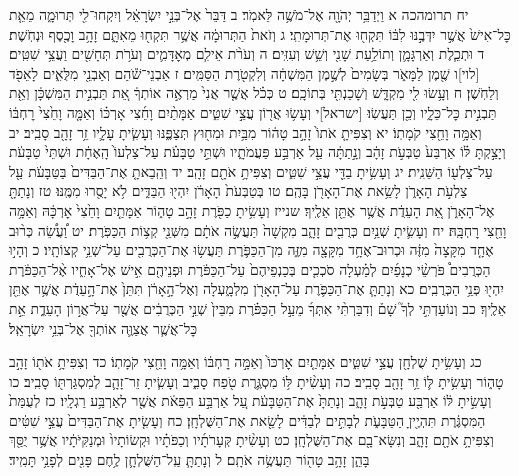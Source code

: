 \documentclass[twoside, openany, parskip=half, 11pt]{book}
\begin{document}
יח תרומהכה א וַיְדַבֵּ֥ר יְהֹוָ֖ה אֶל־מֹשֶׁ֥ה לֵּאמֹֽר׃ ב דַּבֵּר֙ אֶל־בְּנֵ֣י יִשְׂרָאֵ֔ל וְיִקְחוּ־לִ֖י תְּרוּמָ֑ה מֵאֵ֤ת כׇּל־אִישׁ֙ אֲשֶׁ֣ר יִדְּבֶ֣נּוּ לִבּ֔וֹ תִּקְח֖וּ אֶת־תְּרוּמָתִֽי׃ ג וְזֹאת֙ הַתְּרוּמָ֔ה אֲשֶׁ֥ר תִּקְח֖וּ מֵאִתָּ֑ם זָהָ֥ב וָכֶ֖סֶף וּנְחֹֽשֶׁת׃ ד וּתְכֵ֧לֶת וְאַרְגָּמָ֛ן וְתוֹלַ֥עַת שָׁנִ֖י וְשֵׁ֥שׁ וְעִזִּֽים׃ ה וְעֹרֹ֨ת אֵילִ֧ם מְאׇדָּמִ֛ים וְעֹרֹ֥ת תְּחָשִׁ֖ים וַעֲצֵ֥י שִׁטִּֽים׃ [לוי]ו שֶׁ֖מֶן לַמָּאֹ֑ר בְּשָׂמִים֙ לְשֶׁ֣מֶן הַמִּשְׁחָ֔ה וְלִקְטֹ֖רֶת הַסַּמִּֽים׃ ז אַבְנֵי־שֹׁ֕הַם וְאַבְנֵ֖י מִלֻּאִ֑ים לָאֵפֹ֖ד וְלַחֹֽשֶׁן׃ ח וְעָ֥שׂוּ לִ֖י מִקְדָּ֑שׁ וְשָׁכַנְתִּ֖י בְּתוֹכָֽם׃ ט כְּכֹ֗ל אֲשֶׁ֤ר אֲנִי֙ מַרְאֶ֣ה אוֹתְךָ֔ אֵ֚ת תַּבְנִ֣ית הַמִּשְׁכָּ֔ן וְאֵ֖ת תַּבְנִ֣ית כׇּל־כֵּלָ֑יו וְכֵ֖ן תַּעֲשֽׂוּ׃
[ישראל]י וְעָשׂ֥וּ אֲר֖וֹן עֲצֵ֣י שִׁטִּ֑ים אַמָּתַ֨יִם וָחֵ֜צִי אָרְכּ֗וֹ וְאַמָּ֤ה וָחֵ֙צִי֙ רׇחְבּ֔וֹ וְאַמָּ֥ה וָחֵ֖צִי קֹמָתֽוֹ׃ יא וְצִפִּיתָ֤ אֹתוֹ֙ זָהָ֣ב טָה֔וֹר מִבַּ֥יִת וּמִח֖וּץ תְּצַפֶּ֑נּוּ וְעָשִׂ֧יתָ עָלָ֛יו זֵ֥ר זָהָ֖ב סָבִֽיב׃ יב וְיָצַ֣קְתָּ לּ֗וֹ אַרְבַּע֙ טַבְּעֹ֣ת זָהָ֔ב וְנָ֣תַתָּ֔ה עַ֖ל אַרְבַּ֣ע פַּעֲמֹתָ֑יו וּשְׁתֵּ֣י טַבָּעֹ֗ת עַל־צַלְעוֹ֙ הָֽאֶחָ֔ת וּשְׁתֵּי֙ טַבָּעֹ֔ת עַל־צַלְע֖וֹ הַשֵּׁנִֽית׃ יג וְעָשִׂ֥יתָ בַדֵּ֖י עֲצֵ֣י שִׁטִּ֑ים וְצִפִּיתָ֥ אֹתָ֖ם זָהָֽב׃ יד וְהֵֽבֵאתָ֤ אֶת־הַבַּדִּים֙ בַּטַּבָּעֹ֔ת עַ֖ל צַלְעֹ֣ת הָאָרֹ֑ן לָשֵׂ֥את אֶת־הָאָרֹ֖ן בָּהֶֽם׃ טו בְּטַבְּעֹת֙ הָאָרֹ֔ן יִהְי֖וּ הַבַּדִּ֑ים לֹ֥א יָסֻ֖רוּ מִמֶּֽנּוּ׃ טז וְנָתַתָּ֖ אֶל־הָאָרֹ֑ן אֵ֚ת הָעֵדֻ֔ת אֲשֶׁ֥ר אֶתֵּ֖ן אֵלֶֽיךָ׃ שנייז וְעָשִׂ֥יתָ כַפֹּ֖רֶת זָהָ֣ב טָה֑וֹר אַמָּתַ֤יִם וָחֵ֙צִי֙ אׇרְכָּ֔הּ וְאַמָּ֥ה וָחֵ֖צִי רׇחְבָּֽהּ׃ יח וְעָשִׂ֛יתָ שְׁנַ֥יִם כְּרֻבִ֖ים זָהָ֑ב מִקְשָׁה֙ תַּעֲשֶׂ֣ה אֹתָ֔ם מִשְּׁנֵ֖י קְצ֥וֹת הַכַּפֹּֽרֶת׃ יט וַ֠עֲשֵׂ֠ה כְּר֨וּב אֶחָ֤ד מִקָּצָה֙ מִזֶּ֔ה וּכְרוּב־אֶחָ֥ד מִקָּצָ֖ה מִזֶּ֑ה מִן־הַכַּפֹּ֛רֶת תַּעֲשׂ֥וּ אֶת־הַכְּרֻבִ֖ים עַל־שְׁנֵ֥י קְצוֹתָֽיו׃ כ וְהָי֣וּ הַכְּרֻבִים֩ פֹּרְשֵׂ֨י כְנָפַ֜יִם לְמַ֗עְלָה סֹכְכִ֤ים בְּכַנְפֵיהֶם֙ עַל־הַכַּפֹּ֔רֶת וּפְנֵיהֶ֖ם אִ֣ישׁ אֶל־אָחִ֑יו אֶ֨ל־הַכַּפֹּ֔רֶת יִהְי֖וּ פְּנֵ֥י הַכְּרֻבִֽים׃ כא וְנָתַתָּ֧ אֶת־הַכַּפֹּ֛רֶת עַל־הָאָרֹ֖ן מִלְמָ֑עְלָה וְאֶל־הָ֣אָרֹ֔ן תִּתֵּן֙ אֶת־הָ֣עֵדֻ֔ת אֲשֶׁ֥ר אֶתֵּ֖ן אֵלֶֽיךָ׃ כב וְנוֹעַדְתִּ֣י לְךָ֮ שָׁם֒ וְדִבַּרְתִּ֨י אִתְּךָ֜ מֵעַ֣ל הַכַּפֹּ֗רֶת מִבֵּין֙ שְׁנֵ֣י הַכְּרֻבִ֔ים אֲשֶׁ֖ר עַל־אֲר֣וֹן הָעֵדֻ֑ת אֵ֣ת כׇּל־אֲשֶׁ֧ר אֲצַוֶּ֛ה אוֹתְךָ֖ אֶל־בְּנֵ֥י יִשְׂרָאֵֽל׃

כג וְעָשִׂ֥יתָ שֻׁלְחָ֖ן עֲצֵ֣י שִׁטִּ֑ים אַמָּתַ֤יִם אׇרְכּוֹ֙ וְאַמָּ֣ה רׇחְבּ֔וֹ וְאַמָּ֥ה וָחֵ֖צִי קֹמָתֽוֹ׃ כד וְצִפִּיתָ֥ אֹת֖וֹ זָהָ֣ב טָה֑וֹר וְעָשִׂ֥יתָ לּ֛וֹ זֵ֥ר זָהָ֖ב סָבִֽיב׃ כה וְעָשִׂ֨יתָ לּ֥וֹ מִסְגֶּ֛רֶת טֹ֖פַח סָבִ֑יב וְעָשִׂ֧יתָ זֵר־זָהָ֛ב לְמִסְגַּרְתּ֖וֹ סָבִֽיב׃ כו וְעָשִׂ֣יתָ לּ֔וֹ אַרְבַּ֖ע טַבְּעֹ֣ת זָהָ֑ב וְנָתַתָּ֙ אֶת־הַטַּבָּעֹ֔ת עַ֚ל אַרְבַּ֣ע הַפֵּאֹ֔ת אֲשֶׁ֖ר לְאַרְבַּ֥ע רַגְלָֽיו׃ כז לְעֻמַּת֙ הַמִּסְגֶּ֔רֶת תִּהְיֶ֖יןָ הַטַּבָּעֹ֑ת לְבָתִּ֣ים לְבַדִּ֔ים לָשֵׂ֖את אֶת־הַשֻּׁלְחָֽן׃ כח וְעָשִׂ֤יתָ אֶת־הַבַּדִּים֙ עֲצֵ֣י שִׁטִּ֔ים וְצִפִּיתָ֥ אֹתָ֖ם זָהָ֑ב וְנִשָּׂא־בָ֖ם אֶת־הַשֻּׁלְחָֽן׃ כט וְעָשִׂ֨יתָ קְּעָרֹתָ֜יו וְכַפֹּתָ֗יו וּקְשׂוֹתָיו֙ וּמְנַקִּיֹּתָ֔יו אֲשֶׁ֥ר יֻסַּ֖ךְ בָּהֵ֑ן זָהָ֥ב טָה֖וֹר תַּעֲשֶׂ֥ה אֹתָֽם׃ ל וְנָתַתָּ֧ עַֽל־הַשֻּׁלְחָ֛ן לֶ֥חֶם פָּנִ֖ים לְפָנַ֥י תָּמִֽיד׃
\end{document}
